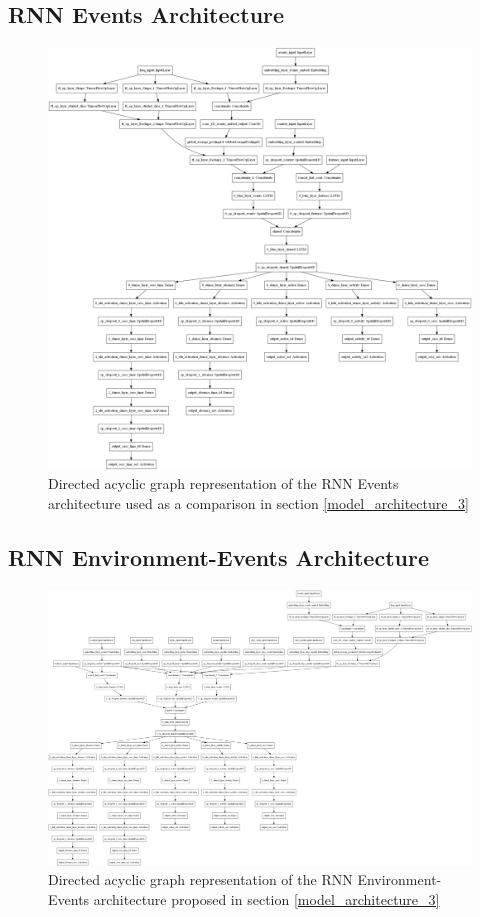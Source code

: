 \subsection{RNN Events Architecture}
\begin{figure}[H]
\centering
\includegraphics[width=\textwidth,height=0.8\textheight,keepaspectratio]{images/appendix_B/rnn_even_3.png}
\caption[\textbf{RNN Events DAG - Section \ref{model_architecture_3}}]{Directed acyclic graph representation of the RNN Events architecture used as a comparison in section \ref{model_architecture_3}}
\label{rnn_even_dag}
\end{figure}

\subsection{RNN Environment-Events Architecture}
\begin{figure}[H]
\centering
\includegraphics[width=\textwidth,height=0.8\textheight,keepaspectratio]{images/appendix_B/rnn_env_even_3.png}
\caption[\textbf{RNN Environment-Events DAG - Section \ref{model_architecture_3}}]{Directed acyclic graph representation of the RNN Environment-Events architecture proposed in section \ref{model_architecture_3}}
\label{rnn_env_even_dag}
\end{figure}